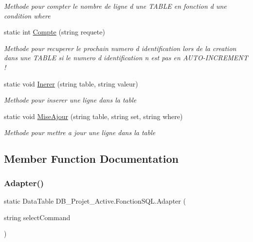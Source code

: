 \begin{DoxyCompactItemize}
\begin{DoxyCompactList}\small\item\em Methode pour compter le nombre de ligne d une T\+A\+B\+LE en fonction d une condition where \end{DoxyCompactList}\item 
static int \mbox{\hyperlink{class_d_b___projet___active_1_1_fonction_s_q_l_ae2bd05ada96dba7e25c282195588c1ff}{Compte}} (string requete)
\begin{DoxyCompactList}\small\item\em Methode pour recuperer le prochain numero d identification lors de la creation dans une T\+A\+B\+LE si le numero d identification n est pas en A\+U\+T\+O-\/\+I\+N\+C\+R\+E\+M\+E\+NT ! \end{DoxyCompactList}\item 
static void \mbox{\hyperlink{class_d_b___projet___active_1_1_fonction_s_q_l_a39d24bb4776f6dd214dd3ba82438759f}{Inerer}} (string table, string valeur)
\begin{DoxyCompactList}\small\item\em Methode pour inserer une ligne dans la table \end{DoxyCompactList}\item 
static void \mbox{\hyperlink{class_d_b___projet___active_1_1_fonction_s_q_l_a4a6c50c6ff240b9c017e84099aa58f93}{Mise\+Ajour}} (string table, string set, string where)
\begin{DoxyCompactList}\small\item\em Methode pour mettre a jour une ligne dans la table \end{DoxyCompactList}\end{DoxyCompactItemize}


\subsection{Member Function Documentation}
\mbox{\label{class_d_b___projet___active_1_1_fonction_s_q_l_a66b653f2a7d59d04cac5946751d79d0a}} 
\subsubsection{\texorpdfstring{Adapter()}{Adapter()}}
{\footnotesize\ttfamily static Data\+Table D\+B\+\_\+\+Projet\+\_\+\+Active.\+Fonction\+S\+Q\+L.\+Adapter (\begin{DoxyParamCaption}\item[{string}]{select\+Command }\end{DoxyParamCaption})\hspace{0.3cm}{\ttfamily [static]}}



